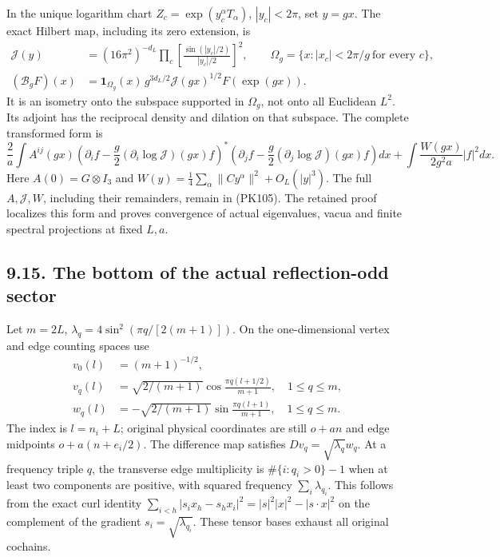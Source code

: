 \documentclass[11pt]{article}
\begin{document}
In the unique logarithm chart \(Z_c=\exp(y_c^\alpha T_\alpha)\),
\(|y_c|<2\pi\), set \(y=gx\). The exact Hilbert map, including its
zero extension, is
\[
 \begin{split}
 \mathcal J(y)&=(16\pi^2)^{-d_L}
   \prod_c\left[\frac{\sin(|y_c|/2)}{|y_c|/2}\right]^2,\qquad
 \Omega_g=\{x:|x_c|<2\pi/g\ \text{for every }c\},\\
 (\mathcal B_gF)(x)&=
 \mathbf1_{\Omega_g}(x)\,g^{3d_L/2}\mathcal J(gx)^{1/2}
                          F(\exp(gx)).
 \end{split}\tag{PK104}
\]
It is an isometry onto the subspace supported in \(\Omega_g\),
not onto all Euclidean \(L^2\). Its adjoint has the reciprocal density
and dilation on that subspace. The complete transformed form is
\[
 \frac2a\int A^{ij}(gx)
 \left(\partial_i f-\frac g2(\partial_i\log\mathcal J)(gx)f\right)^*
 \left(\partial_j f-\frac g2(\partial_j\log\mathcal J)(gx)f\right)dx
 +\int\frac{W(gx)}{2g^2a}|f|^2dx .
 \tag{PK105}
\]
Here \(A(0)=G\otimes I_3\) and
\(W(y)=\frac14\sum_\alpha\|Cy^\alpha\|^2+O_L(|y|^3)\).
The full \(A,\mathcal J,W\), including their remainders, remain in
(PK105). The retained proof localizes this form and proves convergence
of actual eigenvalues, vacua and finite spectral projections at fixed
\(L,a\).

\subsection*{9.15. The bottom of the actual reflection-odd sector}

Let \(m=2L\), \(\lambda_q=4\sin^2(\pi q/[2(m+1)])\).
On the one-dimensional vertex and edge counting spaces use
\[
 \begin{split}
 v_0(l)&=(m+1)^{-1/2},\\
 v_q(l)&=\sqrt{2/(m+1)}
               \cos\frac{\pi q(l+1/2)}{m+1},\quad 1\le q\le m,\\
 w_q(l)&=-\sqrt{2/(m+1)}
               \sin\frac{\pi q(l+1)}{m+1},\quad 1\le q\le m .
 \end{split}\tag{PK106}
\]
The index is \(l=n_i+L\); original physical coordinates are still
\(o+an\) and edge midpoints \(o+a(n+e_i/2)\).
The difference map satisfies \(Dv_q=\sqrt{\lambda_q}w_q\).
At a frequency triple \(q\), the transverse edge multiplicity is
\(\#\{i:q_i>0\}-1\) when at least two components are positive,
with squared frequency \(\sum_i\lambda_{q_i}\).
This follows from the exact curl identity
\(\sum_{i<h}|s_ix_h-s_hx_i|^2=|s|^2|x|^2-|s\cdot x|^2\)
on the complement of the gradient \(s_i=\sqrt{\lambda_{q_i}}\).
These tensor bases exhaust all original cochains.
\end{document}
